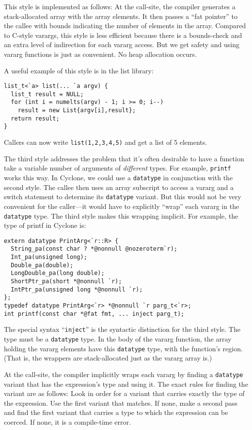This style is implemented as follows: At the call-site, the compiler
generates a stack-allocated array with the array elements.  It then
passes a ``fat pointer'' to the callee with bounds indicating the
number of elements in the array.  Compared to C-style varargs, this
style is less efficient because there is a bounds-check and an extra
level of indirection for each vararg access.  But we get safety and
using vararg functions is just as convenient.  No heap allocation
occurs.

A useful example of this style is in the list library:
\begin{verbatim}
list_t<`a> list(... `a argv) {
  list_t result = NULL;
  for (int i = numelts(argv) - 1; i >= 0; i--) 
    result = new List{argv[i],result};
  return result;
}
\end{verbatim}
Callers can now write \texttt{list(1,2,3,4,5)} and get a list of 5
elements.

The third style addresses the problem that it's often desirable to
have a function take a variable number of arguments of
\emph{different} types.  For example, \texttt{printf} works this way.
In Cyclone, we could use a \texttt{datatype} in conjunction with the
second style.  The callee then uses an array subscript to access a
vararg and a switch statement to determine its \texttt{datatype}
variant.  But this would not be very convenient for the caller---it
would have to explicitly ``wrap'' each vararg in the \texttt{datatype}
type.  The third style makes this wrapping implicit.  For example, the
type of printf in Cyclone is:

\begin{verbatim}
extern datatype PrintArg<`r::R> {
  String_pa(const char ? *@nonnull @nozeroterm`r);
  Int_pa(unsigned long);
  Double_pa(double);
  LongDouble_pa(long double);
  ShortPtr_pa(short *@nonnull `r);
  IntPtr_pa(unsigned long *@nonnull `r);
};
typedef datatype PrintArg<`r> *@nonnull `r parg_t<`r>;
int printf(const char *@fat fmt, ... inject parg_t);
\end{verbatim}

The special syntax ``\texttt{inject}'' is the syntactic distinction
for the third style.  The type must be a \texttt{datatype} type.  In the
body of the vararg function, the array holding the vararg elements have
this \texttt{datatype} type, with the function's region.  (That is, the
wrappers are stack-allocated just as the vararg array is.)

At the call-site, the compiler implicitly wraps each vararg by finding
a \texttt{datatype} variant that has the expression's type and using
it.  The exact rules for finding the variant are as follows:  Look in
order for a variant that carries exactly the type of the expression.
Use the first variant that matches.  If none, make a second pass and
find the first variant that carries a type to which the expression can
be coerced.  If none, it is a compile-time error.

